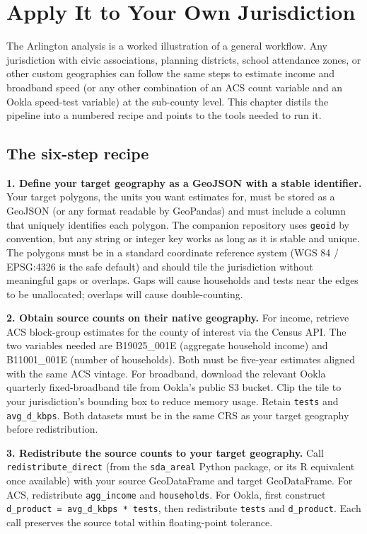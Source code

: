\documentclass[
  letterpaper,
  DIV=11,
  numbers=noendperiod]{scrreprt}
\begin{document}

\chapter{Apply It to Your Own Jurisdiction}\label{sec-apply}

The Arlington analysis is a worked illustration of a general workflow.
Any jurisdiction with civic associations, planning districts, school
attendance zones, or other custom geographies can follow the same steps
to estimate income and broadband speed (or any other combination of an
ACS count variable and an Ookla speed-test variable) at the sub-county
level. This chapter distils the pipeline into a numbered recipe and
points to the tools needed to run it.

\section{The six-step recipe}\label{the-six-step-recipe}

\textbf{1. Define your target geography as a GeoJSON with a stable
identifier.} Your target polygons, the units you want estimates for,
must be stored as a GeoJSON (or any format readable by GeoPandas) and
must include a column that uniquely identifies each polygon. The
companion repository uses \texttt{geoid} by convention, but any string
or integer key works as long as it is stable and unique. The polygons
must be in a standard coordinate reference system (WGS 84 / EPSG:4326 is
the safe default) and should tile the jurisdiction without meaningful
gaps or overlaps. Gaps will cause households and tests near the edges to
be unallocated; overlaps will cause double-counting.

\textbf{2. Obtain source counts on their native geography.} For income,
retrieve ACS block-group estimates for the county of interest via the
Census API. The two variables needed are B19025\_001E (aggregate
household income) and B11001\_001E (number of households). Both must be
five-year estimates aligned with the same ACS vintage. For broadband,
download the relevant Ookla quarterly fixed-broadband tile from Ookla's
public S3 bucket. Clip the tile to your jurisdiction's bounding box to
reduce memory usage. Retain \texttt{tests} and \texttt{avg\_d\_kbps}.
Both datasets must be in the same CRS as your target geography before
redistribution.

\textbf{3. Redistribute the source counts to your target geography.}
Call \texttt{redistribute\_direct} (from the \texttt{sda\_areal} Python
package, or its R equivalent once available) with your source
GeoDataFrame and target GeoDataFrame. For ACS, redistribute
\texttt{agg\_income} and \texttt{households}. For Ookla, first construct
\texttt{d\_product\ =\ avg\_d\_kbps\ *\ tests}, then redistribute
\texttt{tests} and \texttt{d\_product}. Each call preserves the source
total within floating-point tolerance.
\end{document}
